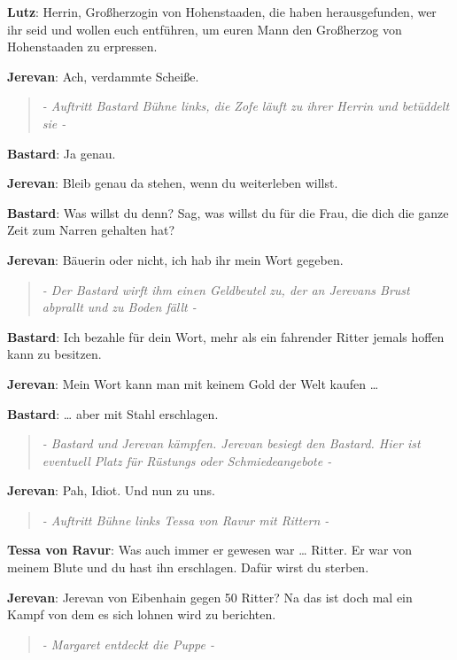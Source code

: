 \documentclass[a5paper,7pt, twocolumn]{book}
\begin{document}
\textbf{Lutz}: Herrin, Großherzogin von Hohenstaaden, die haben herausgefunden, wer ihr seid und wollen euch entführen, um euren Mann den Großherzog von Hohenstaaden zu erpressen.

\textbf{Jerevan}: Ach, verdammte Scheiße.

\begin{quote}
  \textit{- Auftritt Bastard Bühne links, die Zofe läuft zu ihrer Herrin und betüddelt sie -
}
 \end{quote}

\textbf{Bastard}: Ja genau.

\textbf{Jerevan}: Bleib genau da stehen, wenn du weiterleben willst.

\textbf{Bastard}: Was willst du denn? Sag, was willst du für die Frau, die dich die ganze Zeit zum Narren gehalten hat?

\textbf{Jerevan}: Bäuerin oder nicht, ich hab ihr mein Wort gegeben.

\begin{quote}
  \textit{- Der Bastard wirft ihm einen Geldbeutel zu, der an Jerevans Brust abprallt und zu Boden fällt -
}
 \end{quote}

\textbf{Bastard}: Ich bezahle für dein Wort, mehr als ein fahrender Ritter jemals hoffen kann zu besitzen.

\textbf{Jerevan}: Mein Wort kann man mit keinem Gold der Welt kaufen …

\textbf{Bastard}: … aber mit Stahl erschlagen.

\begin{quote}
  \textit{- Bastard und Jerevan kämpfen. Jerevan besiegt den Bastard. Hier ist eventuell Platz für Rüstungs oder Schmiedeangebote -
}
 \end{quote}

\textbf{Jerevan}: Pah, Idiot. Und nun zu uns.

\begin{quote}
  \textit{- Auftritt Bühne links Tessa von Ravur mit Rittern -
}
 \end{quote}

\textbf{Tessa von Ravur}: Was auch immer er gewesen war … Ritter. Er war von meinem Blute und du hast ihn erschlagen. Dafür wirst du sterben.

\textbf{Jerevan}: Jerevan von Eibenhain gegen 50 Ritter? Na das ist doch mal ein Kampf von dem es sich lohnen wird zu berichten.

\begin{quote}
  \textit{- Margaret entdeckt die Puppe -
}
 \end{quote}
\end{document}
